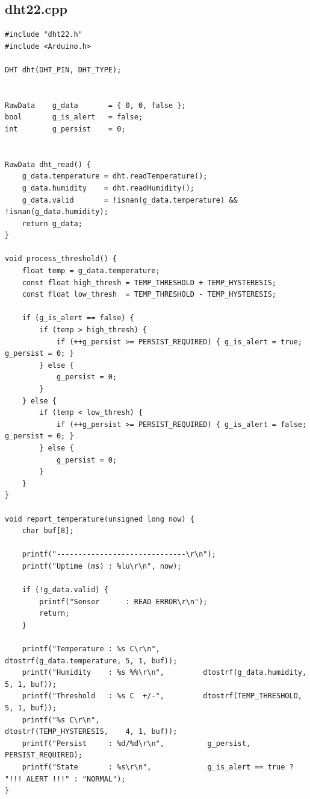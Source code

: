 \documentclass[12pt,a4paper]{article}
\begin{document}
\subsection{dht22.cpp}
\begin{lstlisting}
#include "dht22.h"
#include <Arduino.h>

DHT dht(DHT_PIN, DHT_TYPE);


RawData    g_data       = { 0, 0, false };
bool       g_is_alert   = false;
int        g_persist    = 0;


RawData dht_read() {
    g_data.temperature = dht.readTemperature();
    g_data.humidity    = dht.readHumidity();
    g_data.valid       = !isnan(g_data.temperature) && !isnan(g_data.humidity);
    return g_data;
}

void process_threshold() {
    float temp = g_data.temperature;
    const float high_thresh = TEMP_THRESHOLD + TEMP_HYSTERESIS;
    const float low_thresh  = TEMP_THRESHOLD - TEMP_HYSTERESIS;

    if (g_is_alert == false) {
        if (temp > high_thresh) {
            if (++g_persist >= PERSIST_REQUIRED) { g_is_alert = true;  g_persist = 0; }
        } else {
            g_persist = 0;
        }
    } else {
        if (temp < low_thresh) {
            if (++g_persist >= PERSIST_REQUIRED) { g_is_alert = false; g_persist = 0; }
        } else {
            g_persist = 0;
        }
    }
}

void report_temperature(unsigned long now) {
    char buf[8];

    printf("------------------------------\r\n");
    printf("Uptime (ms) : %lu\r\n", now);

    if (!g_data.valid) {
        printf("Sensor      : READ ERROR\r\n");
        return;
    }

    printf("Temperature : %s C\r\n",         dtostrf(g_data.temperature, 5, 1, buf));
    printf("Humidity    : %s %%\r\n",         dtostrf(g_data.humidity,    5, 1, buf));
    printf("Threshold   : %s C  +/-",         dtostrf(TEMP_THRESHOLD,     5, 1, buf));
    printf("%s C\r\n",                         dtostrf(TEMP_HYSTERESIS,    4, 1, buf));
    printf("Persist     : %d/%d\r\n",          g_persist, PERSIST_REQUIRED);
    printf("State       : %s\r\n",             g_is_alert == true ? "!!! ALERT !!!" : "NORMAL");
}

\end{lstlisting}
\end{document}
